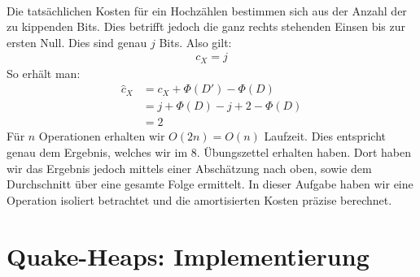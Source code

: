 \documentclass[a4paper,10pt]{article}
\begin{document}
\begin{enumerate}
\begin{align*}
\end{align*}
Die tatsächlichen Kosten für ein Hochzählen bestimmen sich aus der Anzahl der zu kippenden Bits. Dies betrifft jedoch die ganz rechts stehenden Einsen bis zur ersten Null. Dies sind genau $j$ Bits. Also gilt: \begin{align*}
	c_X = j
\end{align*}
So erhält man:\begin{align*}
	\hat c_X &= c_X + \Phi ( D' ) - \Phi ( D )\\
	&= j + \Phi ( D ) - j + 2 - \Phi ( D )\\
	&= 2
\end{align*}
Für $n$ Operationen erhalten wir $O(2n) = O(n)$ Laufzeit.
Dies entspricht genau dem Ergebnis, welches wir im 8. Übungszettel erhalten haben. Dort haben wir das Ergebnis jedoch mittels einer Abschätzung nach oben, sowie dem Durchschnitt über eine gesamte Folge ermittelt. In dieser Aufgabe haben wir eine Operation isoliert betrachtet und die amortisierten Kosten präzise berechnet.
\end{enumerate}

\section{Quake-Heaps: Implementierung}
\end{document}
